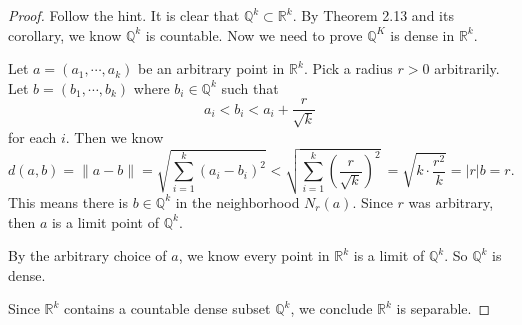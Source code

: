 \begin{Exercise}
\begin{proof}
Follow the hint. It is clear that $\mathbb{Q}^k\subset\mathbb{R}^k$. By Theorem 2.13 and its corollary, we know $\mathbb{Q}^k$ is countable. Now we need to prove $\mathbb{Q}^K$ is dense in $\mathbb{R}^k$.

Let $a = (a_1,\cdots, a_k)$ be an arbitrary point in $\mathbb{R}^k$. Pick a radius $r > 0$ arbitrarily. Let $b = (b_1,\cdots, b_k)$ where $b_i\in\mathbb{Q}^k$ such that
$$
a_i < b_i < a_i+\frac{r}{\sqrt{k}}
$$
for each $i$. Then we know
$$
d(a,b)
= \|a - b \| 
= \sqrt{\sum_{i=1}^{k} (a_i-b_i)^2} 
< \sqrt{\sum_{i=1}^{k} \left( \frac{r}{\sqrt{k}} \right)^2} \ 
= \sqrt{k\cdot\frac{r^2}{k}}  
= |r| b
= r.
$$
This means there is $b\in\mathbb{Q}^k$ in the neighborhood $N_r(a)$. Since $r$ was arbitrary, then $a$ is a limit point of $\mathbb{Q}^k$.

By the arbitrary choice of $a$, we know every point in $\mathbb{R}^k$ is a limit of $\mathbb{Q}^k$. So $\mathbb{Q}^k$ is dense.

Since $\mathbb{R}^k$ contains a countable dense subset $\mathbb{Q}^k$, we conclude $\mathbb{R}^k$ is separable.
\end{proof}
\end{Exercise}